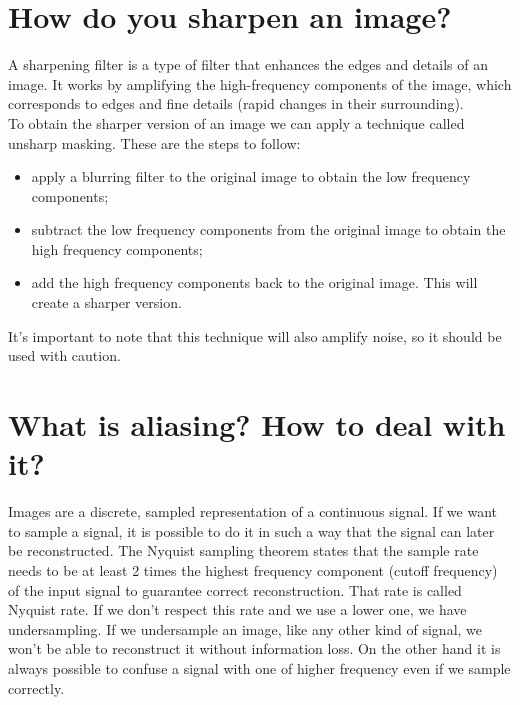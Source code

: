 \documentclass{article}
\begin{document}
\newpage

\section{How do you sharpen an image?}

A sharpening filter is a type of filter that enhances the edges and details of an image. It works by amplifying the high-frequency components of the image, which corresponds to edges and fine details (rapid changes in their surrounding). \\

To obtain the sharper version of an image we can apply a technique called unsharp masking. These are the steps to follow:

\begin{itemize}
    \item apply a blurring filter to the original image to obtain the low frequency components;
    \item subtract the low frequency components from the original image to obtain the high frequency components;
    \item add the high frequency components back to the original image. This will create a sharper version.
\end{itemize}

It's important to note that this technique will also amplify noise, so it should be used with caution.

\newpage

\section{What is aliasing? How to deal with it?}
 
Images are a discrete, sampled representation of a continuous signal. If we want to sample a signal, it is possible to do it in such a way that the signal can later be reconstructed. The Nyquist sampling theorem states that the sample rate needs to be at least 2 times the highest frequency component (cutoff frequency) of the input signal to guarantee correct reconstruction. That rate is called Nyquist rate. If we don't respect this rate and we use a lower one, we have undersampling. If we undersample an image, like any other kind of signal, we won't be able to reconstruct it without information loss. On the other hand it is always possible to confuse a signal with one of higher frequency even if we sample correctly. \\
\end{document}

